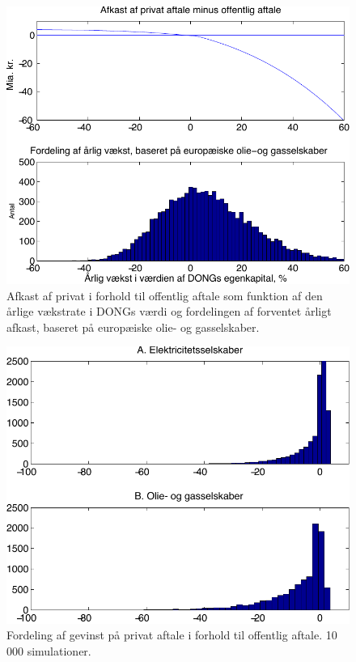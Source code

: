 \documentclass{article}
\begin{document}
\begin{figure}
\centerline{\includegraphics[scale=0.8]{../matlab/figs/afkast_hist_combine_oilgas_guan}}
\caption{Afkast af privat i forhold til offentlig aftale som funktion af den \aa{}rlige v\ae{}kstrate i DONGs v\ae{}rdi og fordelingen af forventet \aa{}rligt afkast, baseret p\aa{} europ\ae{}iske olie- og gasselskaber.}
\label{fig:combine2}
\end{figure}


\begin{figure}
\centerline{\includegraphics[scale=0.8]{../matlab/figs/sim_return_guan}}
\caption{Fordeling af gevinst på privat aftale i forhold til offentlig aftale. 10 000 simulationer. }
\label{fig:sim}
\end{figure}
\end{document}

